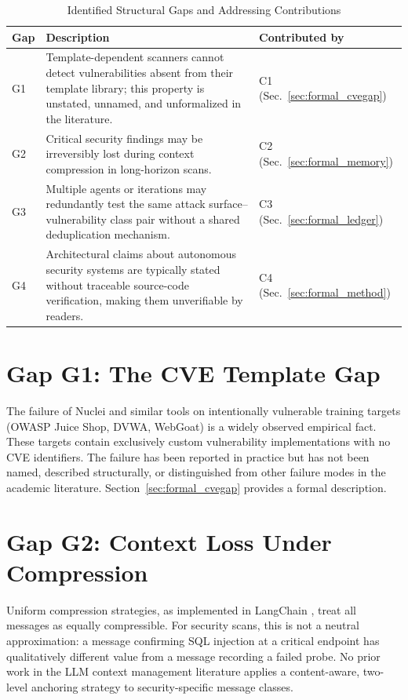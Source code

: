 \documentclass[12pt, a4paper, oneside, openany]{book}
\begin{document}
\begin{table}[H]
\centering
\caption{Identified Structural Gaps and Addressing Contributions}
\label{tab:gaps}
\begin{tabularx}{\textwidth}{@{}l X l@{}}
\toprule
\textbf{Gap} & \textbf{Description} & \textbf{Contributed by} \\
\midrule
G1 & Template-dependent scanners cannot detect vulnerabilities absent
     from their template library; this property is unstated, unnamed,
     and unformalized in the literature.
   & C1 (Sec.~\ref{sec:formal_cvegap}) \\
G2 & Critical security findings may be irreversibly lost during context
     compression in long-horizon scans.
   & C2 (Sec.~\ref{sec:formal_memory}) \\
G3 & Multiple agents or iterations may redundantly test the same attack
     surface--vulnerability class pair without a shared deduplication
     mechanism.
   & C3 (Sec.~\ref{sec:formal_ledger}) \\
G4 & Architectural claims about autonomous security systems are
     typically stated without traceable source-code verification,
     making them unverifiable by readers.
   & C4 (Sec.~\ref{sec:formal_method}) \\
\bottomrule
\end{tabularx}
\end{table}

\section{Gap G1: The CVE Template Gap}
\label{sec:gap_cvegap}

The failure of Nuclei and similar tools on intentionally vulnerable
training targets (OWASP Juice Shop, DVWA, WebGoat) is a widely
observed empirical fact.  These targets contain exclusively custom
vulnerability implementations with no CVE identifiers.  The failure
has been reported in practice but has not been named, described
structurally, or distinguished from other failure modes in the
academic literature.  Section~\ref{sec:formal_cvegap} provides a
formal description.

\section{Gap G2: Context Loss Under Compression}
\label{sec:gap_context}

Uniform compression strategies, as implemented in LangChain
\citep{langchain2023}, treat all messages as equally compressible.
For security scans, this is not a neutral approximation: a message
confirming SQL injection at a critical endpoint has qualitatively
different value from a message recording a failed probe.  No prior
work in the LLM context management literature applies a
content-aware, two-level anchoring strategy to security-specific
message classes.
\end{document}

